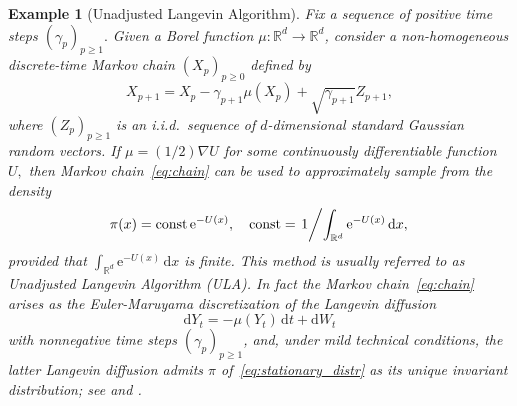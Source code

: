 \documentclass[aap,preprint]{imsart}
\def\rmd{\mathrm{d}}
\def\rme{\mathrm{e}}
\newtheorem{example}{Example}
\begin{document}
\begin{example}[Unadjusted Langevin Algorithm]
\label{exam:langevin-algorithm}
Fix a sequence of positive time steps \((\gamma_p)_{p\geq 1}.\) Given a Borel function $\mu\colon\mathbb{R}^{d}\to\mathbb{R}^{d}$,
consider a non-homogeneous
discrete-time Markov chain $(X_{p})_{p\geq0}$ defined by
\begin{equation}\label{eq:chain}
X_{p+1}=X_{p}-\gamma_{p+1}\mu(X_{p})+\sqrt{\gamma_{p+1}}Z_{p+1},\end{equation}
where $\left(Z_{p}\right)_{p\geq1}$ is an i.i.d.\ sequence of $d$-dimensional
standard Gaussian random vectors. If
${\mu=(1/2)\nabla U}$
for some continuously differentiable function $U,$ then Markov chain~\eqref{eq:chain} can be used to approximately sample from the density
\begin{equation}\label{eq:stationary_distr}
\pi(x)= \mathrm{const}\,\rme^{-U(x)}, \quad \mathrm{const}= \left. 1 \middle /{\int_{\mathbb{R}^{d}} \rme^{-U(x)}\, \rmd x,} \right.
\end{equation}
provided that \(\int_{\mathbb{R}^{d}} \rme^{-U(x)}\,\rmd x\) is finite. This method is usually referred to as
Unadjusted Langevin Algorithm (ULA).
In fact the Markov chain~\eqref{eq:chain}
arises as the Euler-Maruyama discretization
of the Langevin diffusion
\[
\rmd Y_t=-\mu(Y_t)\,\rmd t+ \rmd W_t
\]
with nonnegative time steps $(\gamma_p)_{p\ge1}$,
and,  under mild technical conditions, the latter Langevin diffusion admits $\pi$
of~\eqref{eq:stationary_distr}
as its unique invariant distribution; see \cite{dalalyan2017theoretical} and \cite{durmus:moulines:2017}.
\end{example}
\end{document}
